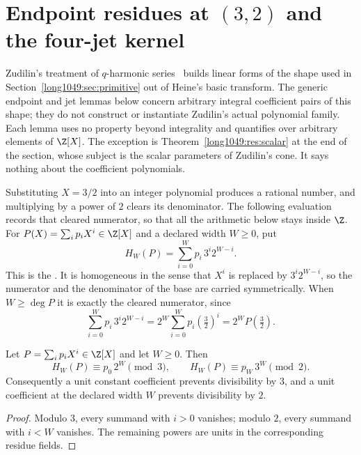 \section{Endpoint residues at $(3,2)$ and the four-jet
kernel}\label{long1049:sec:endpoints}

Zudilin's treatment of \(q\)-harmonic series~\cite{zudilin2004} builds linear
forms of the shape used in Section~\ref{long1049:sec:primitive} out of Heine's basic
transform.  The generic endpoint and jet lemmas below concern arbitrary
integral coefficient pairs of this shape; they do not construct or instantiate
Zudilin's actual polynomial family.  Each lemma uses no property beyond
integrality and quantifies over arbitrary elements of \(\Z[X]\).  The exception is
Theorem~\ref{long1049:res:scalar} at the end of the section, whose subject is the scalar
parameters of Zudilin's cone.  It says nothing about the coefficient
polynomials.

Substituting \(X=3/2\) into an integer polynomial produces a rational number,
and multiplying by a power of \(2\) clears its denominator.  The following
evaluation records that cleared numerator, so that all the arithmetic below
stays inside \(\Z\).  For \(P(X)=\sum_i p_iX^i\in\Z[X]\) and a declared width
\(W\ge0\), put
\[
 H_W(P)=\sum_{i=0}^{W}p_i\,3^i2^{W-i}.
\]
This is the
.  It is homogeneous in the sense that \(X^{i}\) is
replaced by \(3^{i}2^{W-i}\), so the numerator and the denominator of the base
are carried symmetrically.  When \(W\ge\deg P\) it is exactly the cleared
numerator, since
\[
 \sum_{i=0}^{W}p_i\,3^i2^{W-i}=2^{W}\sum_{i=0}^{W}p_i\left(\tfrac32\right)^{i}
 =2^{W}P\!\left(\tfrac32\right).
\]

\begin{theorem}\label{long1049:res:endpoints}
Let \(P=\sum_ip_iX^i\in\Z[X]\) and let \(W\ge0\).  Then
\[
 H_W(P)\equiv p_0\,2^W\pmod 3,\qquad
 H_W(P)\equiv p_W\,3^W\pmod 2.
\]
Consequently a unit constant coefficient prevents divisibility by \(3\), and
a unit coefficient at the declared width \(W\) prevents divisibility by \(2\).
\end{theorem}

\begin{proof}
Modulo \(3\), every summand with \(i>0\) vanishes; modulo \(2\), every summand
with \(i<W\) vanishes.  The remaining powers are units in the corresponding
residue fields.
\end{proof}

